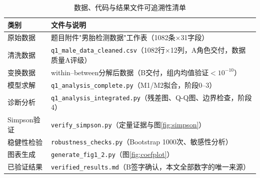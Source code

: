 \documentclass[12pt,a4paper]{ctexart}
\begin{document}
\begin{table}[htbp]
\centering
\caption{数据、代码与结果文件可追溯性清单}
\label{tab:trace}
\begin{tabular}{p{4.5cm}p{9.5cm}}
\toprule
类别 & 文件与说明 \\
\midrule
原始数据 & 题目附件"男胎检测数据"工作表（1082条$\times$31字段） \\
清洗数据 & \texttt{q1\_male\_data\_cleaned.csv}（1082行$\times$12列，A角色交付，数据质量A评级） \\
变换数据 & within--between分解后数据（B交付，组内均值验证$<10^{-10}$） \\
模型求解 & \texttt{q1\_analysis\_complete.py}（M1/M2拟合，阶段0--3） \\
诊断分析 & \texttt{q1\_analysis\_integrated.py}（残差图、Q-Q图、边界检查，阶段4） \\
Simpson验证 & \texttt{verify\_simpson.py}（定量证据与图\ref{fig:simpson}） \\
稳健性检验 & \texttt{robustness\_checks.py}（Bootstrap 1000次、敏感性分析） \\
图表生成 & \texttt{generate\_fig1\_2.py}（图\ref{fig:coefplot}） \\
已验证结果 & \texttt{verified\_results.md}（B签字确认，本文全部数字的唯一来源） \\
\bottomrule
\end{tabular}
\end{table}
\end{document}
